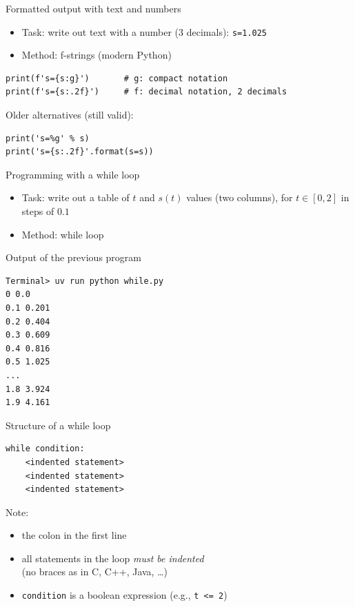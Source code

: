 \begin{frame}[fragile]{Formatted output with text and numbers}
  \begin{itemize}
    \item Task: write out text with a number (3 decimals): \texttt{s=1.025}
    \item Method: f-strings (modern Python)
  \end{itemize}
\begin{lstlisting}[style=pythoncompact]
print(f's={s:g}')       # g: compact notation
print(f's={s:.2f}')     # f: decimal notation, 2 decimals
\end{lstlisting}
  Older alternatives (still valid):
\begin{lstlisting}[style=pythoncompact]
print('s=%g' % s)
print('s={s:.2f}'.format(s=s))
\end{lstlisting}
\end{frame}

\begin{frame}[fragile]{Programming with a while loop}
  \begin{itemize}
    \item Task: write out a table of $t$ and $s(t)$ values (two columns),
          for $t\in [0,2]$ in steps of $0.1$
    \item Method: while loop
  \end{itemize}

\end{frame}

\begin{frame}[fragile]{Output of the previous program}
\begin{lstlisting}[style=terminal]
Terminal> uv run python while.py
0 0.0
0.1 0.201
0.2 0.404
0.3 0.609
0.4 0.816
0.5 1.025
...
1.8 3.924
1.9 4.161
\end{lstlisting}
\end{frame}

\begin{frame}[fragile]{Structure of a while loop}
\begin{lstlisting}[style=pythoncompact]
while condition:
    <indented statement>
    <indented statement>
    <indented statement>
\end{lstlisting}
  Note:
  \begin{itemize}
    \item the colon in the first line
    \item all statements in the loop \emph{must be indented}\\
          (no braces as in C, C++, Java, \ldots)
    \item \texttt{condition} is a boolean expression (e.g., \texttt{t <= 2})
  \end{itemize}
\end{frame}

